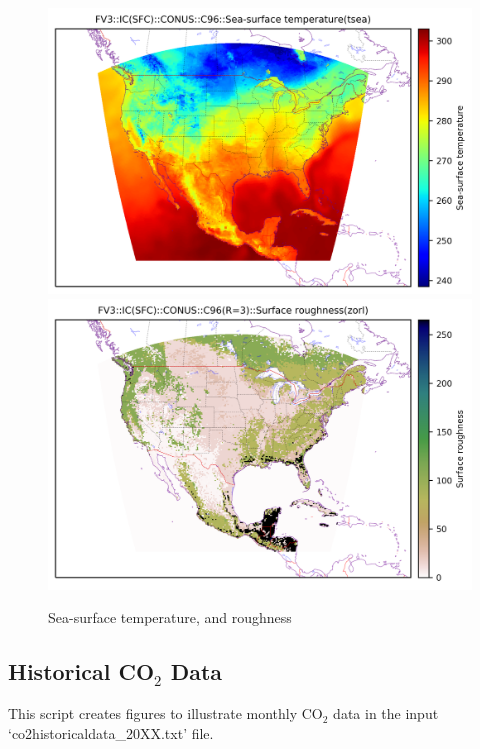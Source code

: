 \documentclass[11pt,fleqn]{report}              %
\begin{document}
\begin{enumerate}
\begin{figure}[ht!]
  \centering
  \includegraphics[width=0.48\linewidth]{fv3_isfc_CONUS_C96_tsea.png}
  \includegraphics[width=0.48\linewidth]{fv3_isfc_CONUS_C96_zorl.png}  
  \caption{Sea-surface temperature, and roughness}
  \label{fig:py_isfc_zorl}
\end{figure}


\end{enumerate}




\subsection{Historical CO$_2$ Data}

This script creates figures to illustrate monthly CO$_2$ data in the input `co2historicaldata\_20XX.txt' file.
\end{document}
